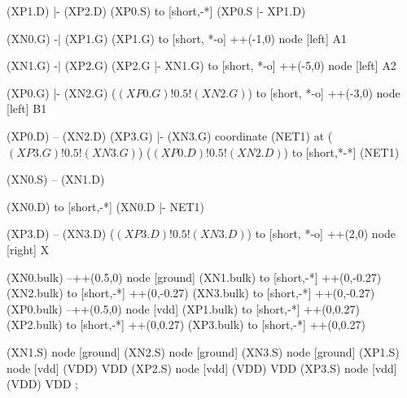 \begin{circuitikz}[american]

	(XP1.D) |- (XP2.D)
	(XP0.S) to [short,-*] (XP0.S |- XP1.D)
	
	(XN0.G) -| (XP1.G)
	(XP1.G) to [short, *-o] ++(-1,0) node [left] {A1}
	
	(XN1.G) -| (XP2.G)
	(XP2.G |- XN1.G) to [short, *-o] ++(-5,0) node [left] {A2}
	
	(XP0.G) |- (XN2.G) 
	($(XP0.G)!0.5!(XN2.G)$) to [short, *-o] ++(-3,0) node [left] {B1}
	
	(XP0.D) -- (XN2.D)
	(XP3.G) |- (XN3.G)
	coordinate (NET1) at ($(XP3.G)!0.5!(XN3.G)$)
	($(XP0.D)!0.5!(XN2.D)$) to [short,*-*]  (NET1)
	
	(XN0.S) -- (XN1.D)
	
	(XN0.D) to [short,-*] (XN0.D |- NET1)
	
	(XP3.D) -- (XN3.D)
	($(XP3.D)!0.5!(XN3.D)$) to [short, *-o] ++(2,0) node [right] {X}
	
	(XN0.bulk) --++(0.5,0) node [ground]{}%
   	(XN1.bulk) to [short,-*] ++(0,-0.27)
	(XN2.bulk) to [short,-*] ++(0,-0.27)
	(XN3.bulk) to [short,-*] ++(0,-0.27)
	(XP0.bulk) --++(0.5,0) node [vdd]{}%
	(XP1.bulk) to [short,-*] ++(0,0.27)
	(XP2.bulk) to [short,-*] ++(0,0.27)
	(XP3.bulk) to [short,-*] ++(0,0.27)
	

	(XN1.S) node [ground] {}
	(XN2.S) node [ground] {}
	(XN3.S) node [ground] {}
	(XP1.S) node [vdd] (VDD) {VDD}
	(XP2.S) node [vdd] (VDD) {VDD}
	(XP3.S) node [vdd] (VDD) {VDD}
;

\end{circuitikz}
